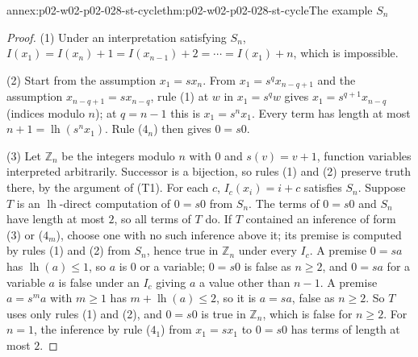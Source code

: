 \begin{annexitem}{annex:p02-w02-p02-028-st-cycle}{thm:p02-w02-p02-028-st-cycle}{The example \(S_n\)}
\begin{proof}
(1) Under an interpretation satisfying \(S_n\), \(I(x_1)=I(x_n)+1=
I(x_{n-1})+2=\cdots=I(x_1)+n\), which is impossible.

(2) Start from the assumption \(x_1=sx_n\).  From \(x_1=s^qx_{n-q+1}\) and
the assumption \(x_{n-q+1}=sx_{n-q}\), rule (1) at \(w\) in \(x_1=s^qw\)
gives \(x_1=s^{q+1}x_{n-q}\) (indices modulo \(n\)); at \(q=n-1\) this is
\(x_1=s^nx_1\).  Every term has length at most \(n+1=\operatorname{lh}(s^nx_1)\).
Rule (\(4_n\)) then gives \(0=s0\).

(3) Let \(\mathbb Z_n\) be the integers modulo \(n\) with \(0\) and
\(s(v)=v+1\), function variables interpreted arbitrarily.  Successor is a
bijection, so rules (1) and (2) preserve truth there, by the argument of
(T1).  For each \(c\), \(I_c(x_i)=i+c\) satisfies \(S_n\).  Suppose \(T\) is
an \(\operatorname{lh}\)-direct computation of \(0=s0\) from \(S_n\).  The
terms of \(0=s0\) and \(S_n\) have length at most \(2\), so all terms of \(T\)
do.  If \(T\) contained an inference of form (3) or (\(4_m\)), choose one
with no such inference above it; its premise is computed by rules (1) and (2)
from \(S_n\), hence true in \(\mathbb Z_n\) under every \(I_c\).  A premise
\(0=sa\) has \(\operatorname{lh}(a)\leq1\), so \(a\) is \(0\) or a variable;
\(0=s0\) is false as \(n\geq2\), and \(0=sa\) for a variable \(a\) is false
under an \(I_c\) giving \(a\) a value other than \(n-1\).  A premise
\(a=s^ma\) with \(m\geq1\) has \(m+\operatorname{lh}(a)\leq2\), so it is
\(a=sa\), false as \(n\geq2\).  So \(T\) uses only rules (1) and (2), and
\(0=s0\) is true in \(\mathbb Z_n\), which is false for \(n\geq2\).  For
\(n=1\), the inference by rule (\(4_1\)) from \(x_1=sx_1\) to \(0=s0\) has
terms of length at most \(2\).
\end{proof}
\end{annexitem}

